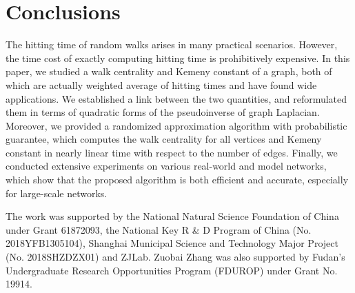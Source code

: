 \documentclass[sigconf]{acmart}
\begin{document}



\section{Conclusions}

The hitting time of random walks arises  in many practical scenarios. However, the time cost of exactly computing hitting time is prohibitively expensive. In this paper, we studied a walk centrality and Kemeny constant of a graph, both of which are actually weighted average of hitting times and have found wide  applications. We established a link between the two quantities, and reformulated them in terms of quadratic forms of the pseudoinverse of graph Laplacian. Moreover, we provided a randomized approximation algorithm with probabilistic guarantee, which computes the walk centrality for all vertices and Kemeny constant in nearly linear time with respect to  the number of edges. Finally, we conducted extensive experiments on various real-world and model networks, which show that the proposed  algorithm is both efficient and accurate, especially for large-scale networks. %


\begin{acks}
	The work was supported by the National Natural Science
	Foundation of China under Grant 61872093, the National Key R \& D Program of China
	(No. 2018YFB1305104), Shanghai Municipal Science and Technology Major Project  (No.  2018SHZDZX01) and ZJLab. Zuobai Zhang was also supported by Fudan's Undergraduate Research Opportunities Program (FDUROP) under Grant No. 19914.
\end{acks}


\balance

\end{document}
